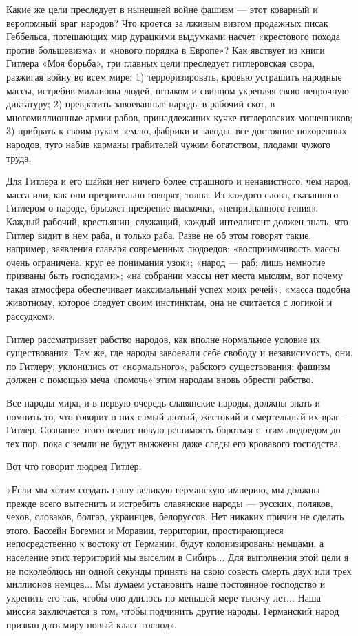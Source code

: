\documentclass[12pt, a4paper, openany]{book}
\begin{document}
Какие же цели преследует в нынешней войне фашизм — этот коварный и вероломный враг народов? Что кроется за лживым визгом продажных писак Геббельса, потешающих мир дурацкими выдумками насчет «крестового похода против большевизма» и «нового порядка в Европе»? Как явствует из книги Гитлера «Моя борьба», три главных цели преследует гитлеровская свора, разжигая войну во всем мире: 1) терроризировать, кровью устрашить народные массы, истребив миллионы людей, штыком и свинцом укрепляя свою непрочную диктатуру; 2) превратить завоеванные народы в рабочий скот, в многомиллионные армии рабов, принадлежащих кучке гитлеровских мошенников; 3) прибрать к своим рукам землю, фабрики и заводы. все достояние покоренных народов, туго набив карманы грабителей чужим богатством, плодами чужого труда.

Для Гитлера и его шайки нет ничего более страшного и ненавистного, чем народ, масса или, как они презрительно говорят, толпа. Из каждого слова, сказанного Гитлером о народе, брызжет презрение выскочки, «непризнанного гения». Каждый рабочий, крестьянин, служащий, каждый интеллигент должен знать, что Гитлер видит в нем раба, и только раба. Разве не об этом говорят такие, например, заявления главаря современных людоедов: «восприимчивость массы очень ограничена, круг ее понимания узок»; «народ — раб; лишь немногие призваны быть господами»; «на собрании массы нет места мыслям, вот почему такая атмосфера обеспечивает максимальный успех моих речей»; «масса подобна животному, которое следует своим инстинктам, она не считается с логикой и рассудком».

Гитлер рассматривает рабство народов, как вполне нормальное условие их существования. Там же, где народы завоевали себе свободу и независимость, они, по Гитлеру, уклонились от «нормального», рабского существования; фашизм должен с помощью меча «помочь» этим народам вновь обрести рабство.

Все народы мира, и в первую очередь славянские народы, должны знать и помнить то, что говорит о них самый лютый, жестокий и смертельный их враг — Гитлер. Сознание этого вселит новую решимость бороться с этим людоедом до тех пор, пока с земли не будут выжжены даже следы его кровавого господства.

Вот что говорит людоед Гитлер:

«Если мы хотим создать нашу великую германскую империю, мы должны прежде всего вытеснить и истребить славянские народы — русских, поляков, чехов, словаков, болгар, украинцев, белоруссов. Нет никаких причин не сделать этого. Бассейн Богемии и Моравии, территории, простирающиеся непосредственно к востоку от Германии, будут колонизированы немцами, а население этих территорий мы выселим в Сибирь... Для выполнения этой цели я не поколеблюсь ни одной секунды принять на свою совесть смерть двух или трех миллионов немцев... Мы думаем установить наше постоянное господство и укрепить его так, чтобы оно длилось по меньшей мере тысячу лет... Наша миссия заключается в том, чтобы подчинить другие народы. Германский народ призван дать миру новый класс господ».
\end{document}
